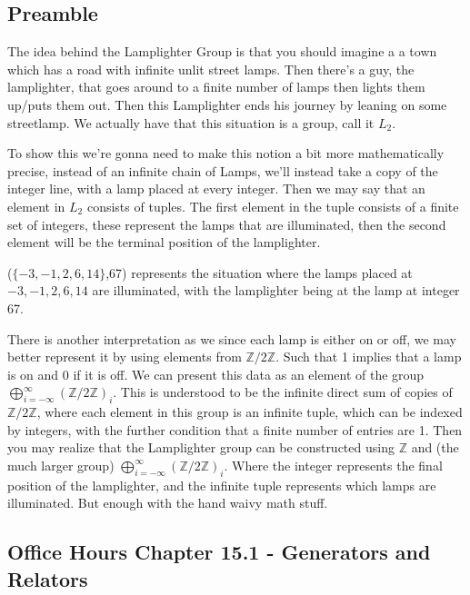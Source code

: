\subsection{Preamble}
The idea behind the Lamplighter Group is that you should imagine a a town which has a road with infinite unlit street lamps. Then there's a guy, the lamplighter, that goes around to a finite number of lamps then lights them up/puts them out. Then this Lamplighter ends his journey by leaning on some streetlamp. We actually have that this situation is a group, call it $L_2$.

To show this we're gonna need to make this notion a bit more mathematically precise, instead of an infinite chain of Lamps, we'll instead take a copy of the integer line, with a lamp placed at every integer. Then we may say that an element in $L_2$ consists of tuples. The first element in the tuple consists of a finite set of integers, these represent the lamps that are illuminated, then the second element will be the terminal position of the lamplighter.
\begin{example}
    ($\{-3,-1,2,6,14
\}$,67) represents the situation where the lamps placed at $-3,-1,2,6,14$ are illuminated, with the lamplighter being at the lamp at integer 67.
\end{example}
There is another interpretation as we since each lamp is either on or off, we may better represent it by using elements from $\mathbb{Z}/2\mathbb{Z}$. Such that 1 implies that a lamp is on and 0 if it is off. We can present this data as an element of the group $\bigoplus^{\infty}_{i=-\infty}(\mathbb{Z}/2\mathbb{Z})_i$. This is understood to be the infinite direct sum of copies of $\mathbb{Z}/2\mathbb{Z}$, where each element in this group is an infinite tuple, which can be indexed by integers, with the further condition that a finite number of entries are 1. Then you may realize that the Lamplighter group can be constructed using $\mathbb{Z}$ and (the much larger group) $\bigoplus^{\infty}_{i=-\infty}(\mathbb{Z}/2\mathbb{Z})_i$. Where the integer represents the final position of the lamplighter, and the infinite tuple represents which lamps are illuminated. But enough with the hand waivy math stuff.
\subsection{Office Hours Chapter 15.1 - Generators and Relators}


